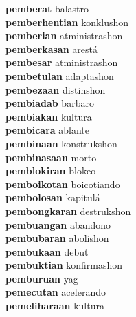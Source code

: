 \textbf{pemberat } balastro \\
\textbf{pemberhentian } konklushon \\
\textbf{pemberian } atministrashon \\
\textbf{pemberkasan } arestá \\
\textbf{pembesar } atministrashon \\
\textbf{pembetulan } adaptashon \\
\textbf{pembezaan } distinshon \\
\textbf{pembiadab } barbaro \\
\textbf{pembiakan } kultura \\
\textbf{pembicara } ablante \\
\textbf{pembinaan } konstrukshon \\
\textbf{pembinasaan } morto \\
\textbf{pemblokiran } blokeo \\
\textbf{pemboikotan } boicotiando \\
\textbf{pembolosan } kapitulá \\
\textbf{pembongkaran } destrukshon \\
\textbf{pembuangan } abandono \\
\textbf{pembubaran } abolishon \\
\textbf{pembukaan } debut \\
\textbf{pembuktian } konfirmashon \\
\textbf{pemburuan } yag \\
\textbf{pemecutan } acelerando \\
\textbf{pemeliharaan } kultura \\
